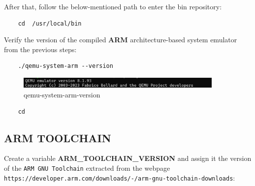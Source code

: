 \documentclass{exam}
\begin{document}
After that, follow the below-mentioned path to enter the bin repository:
\begin{lstlisting}
    cd  /usr/local/bin 
\end{lstlisting}
Verify the version of the compiled \textbf{ARM} architecture-based system emulator from the previous steps:
\begin{lstlisting}
    ./qemu-system-arm --version
\end{lstlisting}
\begin{figure}[h]
    \centering
    \includegraphics[width=0.90\textwidth]{graphics/qemu-system-arm-version.png}
    \caption{qemu-system-arm-version}
    \label{fig:riferimentoNelTestoNelCasoVogliaCitareLimmagine}
\end{figure}

\begin{lstlisting}
    cd
\end{lstlisting}
\subsection{ARM TOOLCHAIN}

Create a variable \textbf{ARM\_TOOLCHAIN\_VERSION} and assign it the version of the \texttt{ARM GNU Toolchain} extracted from the webpage \texttt{https://developer.arm.com/downloads/-/arm-gnu-toolchain-downloads}:
\end{document}
